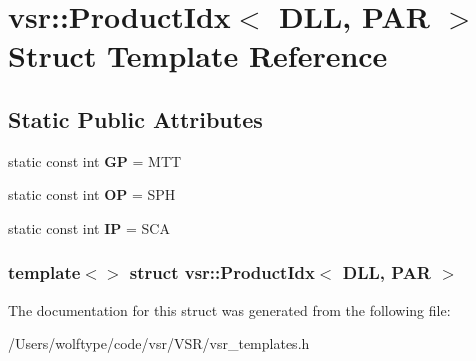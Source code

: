 \hypertarget{structvsr_1_1_product_idx_3_01_d_l_l_00_01_p_a_r_01_4}{\section{vsr\-:\-:Product\-Idx$<$ D\-L\-L, P\-A\-R $>$ Struct Template Reference}
\label{structvsr_1_1_product_idx_3_01_d_l_l_00_01_p_a_r_01_4}
}
\subsection*{Static Public Attributes}
\begin{DoxyCompactItemize}
\item 
\hypertarget{structvsr_1_1_product_idx_3_01_d_l_l_00_01_p_a_r_01_4_a25839c4b938ff8b53ae167a3c2ba2d99}{static const int {\bfseries G\-P} = M\-T\-T}\label{structvsr_1_1_product_idx_3_01_d_l_l_00_01_p_a_r_01_4_a25839c4b938ff8b53ae167a3c2ba2d99}

\item 
\hypertarget{structvsr_1_1_product_idx_3_01_d_l_l_00_01_p_a_r_01_4_af5be5646f4ce6f7616b41420e32841c0}{static const int {\bfseries O\-P} = S\-P\-H}\label{structvsr_1_1_product_idx_3_01_d_l_l_00_01_p_a_r_01_4_af5be5646f4ce6f7616b41420e32841c0}

\item 
\hypertarget{structvsr_1_1_product_idx_3_01_d_l_l_00_01_p_a_r_01_4_a94bec4412862a99fff5dd7c9fba7f619}{static const int {\bfseries I\-P} = S\-C\-A}\label{structvsr_1_1_product_idx_3_01_d_l_l_00_01_p_a_r_01_4_a94bec4412862a99fff5dd7c9fba7f619}

\end{DoxyCompactItemize}
\subsubsection*{template$<$$>$ struct vsr\-::\-Product\-Idx$<$ D\-L\-L, P\-A\-R $>$}



The documentation for this struct was generated from the following file\-:\begin{DoxyCompactItemize}
\item 
/\-Users/wolftype/code/vsr/\-V\-S\-R/vsr\-\_\-templates.\-h\end{DoxyCompactItemize}
